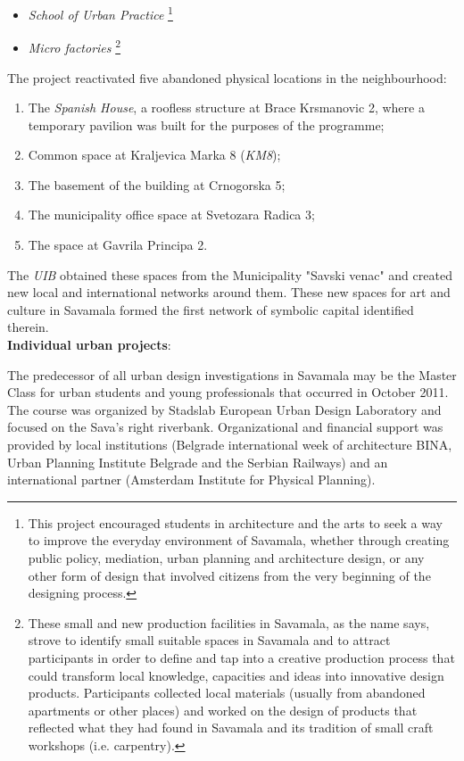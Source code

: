 \documentclass[11pt]{report}
\begin{document}
{{{{\begin{itemize}
\begin{itemize}
\item \textit{School of Urban Practice}
\footnote{This project encouraged students in architecture and the arts to seek a way to improve the everyday environment of Savamala, whether through creating public policy, mediation, urban planning and architecture design, or any other form of design that involved citizens from the very beginning of the designing process.}

\item \textit{Micro factories}
\footnote{These small and new production facilities in Savamala, as the name says, strove to identify small suitable spaces in Savamala and to attract participants in order to define and tap into a creative production process that could transform local knowledge, capacities and ideas into innovative design products.
Participants collected local materials (usually from abandoned apartments or other places) and worked on the design of products that reflected what they had found in Savamala and its tradition of small craft workshops (i.e. carpentry).}
\end{itemize}
\end{itemize}

The project reactivated five abandoned physical locations in the neighbourhood:

\begin{enumerate}
\item The \textit{Spanish House}, a roofless structure at Brace Krsmanovic 2, where a temporary pavilion was built for the purposes of the programme;

\item Common space at Kraljevica Marka 8 (\textit{KM8});

\item The basement of the building at Crnogorska 5;

\item The municipality office space at Svetozara Radica 3;

\item The space at Gavrila Principa 2.
\end{enumerate}

The \textit{UIB} obtained these spaces from the Municipality "Savski venac" and created new local and international networks around them.
These new spaces for art and culture in Savamala formed the first network of symbolic capital identified therein.
\\
\textbf{Individual urban projects}:

The predecessor of all urban design investigations in Savamala may be the Master Class for urban students and young professionals that occurred in October 2011. The course was organized by Stadslab European Urban Design Laboratory and focused on the Sava’s right riverbank. Organizational and financial support was provided by local institutions (Belgrade international week of architecture BINA, Urban Planning Institute Belgrade and the Serbian Railways) and an international partner (Amsterdam Institute for Physical Planning).
\\

}}}}
\end{document}
